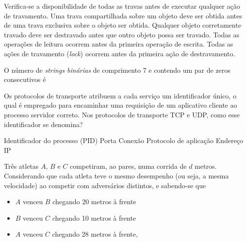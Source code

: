 \documentclass[12pt, addpoints]{exam}
\begin{document}
\begin{questions}
\begin{choices}
\choice Verifica-se a disponibilidade de todas as travas antes de executar qualquer ação de travamento.
\choice Uma trava compartilhada sobre um objeto deve ser obtida antes de uma trava exclusiva sobre o objeto ser obtida.
\choice Qualquer objeto corretamente travado deve ser destravado antes que outro objeto possa ser travado.
\choice Todas as operações de leitura ocorrem antes da primeira operação de escrita.
\choice Todas as ações de travamento (\textit{lock}) ocorrem antes da primeira ação de destravamento.
\end{choices}

\question

O número de \textit{strings binárias} de comprimento 7 e contendo um par de zeros consecutivos é


\begin{choices}
\end{choices}

\question

Os protocolos de transporte atribuem a cada serviço um identificador único, o qual é empregado para encaminhar uma requisição de um aplicativo cliente ao processo servidor correto. Nos protocolos de transporte TCP e UDP, como esse identificador se denomina?
\begin{choices}
\choice Identificador do processo (PID)
\choice Porta
\choice Conexão
\choice Protocolo de aplicação
\choice Endereço IP
\end{choices}

\question

Três atletas \( A \), \( B \) e \( C \) competiram, ao pares, numa corrida de \( d \) metros. Considerando que cada atleta teve o mesmo desempenho (ou seja, a mesma velocidade) ao competir com adversários distintos, e sabendo-se que



\begin{itemize}

    \item \( A \) venceu \( B \) chegando 20 metros à frente

    \item \( B \) venceu \( C \) chegando 10 metros à frente

    \item \( A \) venceu \( C \) chegando 28 metros à frente,

\end{itemize}




\end{questions}
\end{document}
